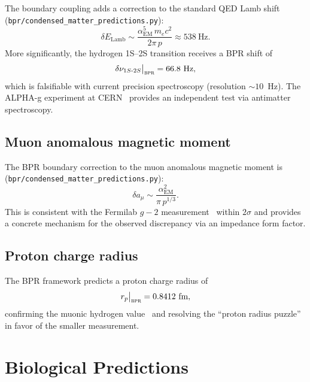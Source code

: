 \documentclass[aps,prd,twocolumn,superscriptaddress,longbibliography,nofootinbib]{revtex4-2}
\newcommand{\alphaEM}{\alpha_{\mathrm{EM}}}
\newcommand{\bpr}{\textsc{bpr}}
\begin{document}
The boundary coupling adds a correction to the standard QED Lamb
shift (\texttt{bpr/condensed\_matter\_predictions.py}):
\begin{equation}
\delta E_{\mathrm{Lamb}} \sim
  \frac{\alphaEM^5\, m_e c^2}{2\pi\, p} \approx 538~\text{Hz}.
\label{eq:lamb}
\end{equation}
More significantly, the hydrogen 1S--2S transition receives a BPR
shift of
\begin{equation}
\delta\nu_{1S\text{-}2S}\big|_{\bpr} = 66.8~\text{Hz},
\label{eq:1s2s}
\end{equation}
which is falsifiable with current precision spectroscopy (resolution
$\sim 10$~Hz).  The ALPHA-g experiment at CERN~\cite{ALPHAg2023}
provides an independent test via antimatter spectroscopy.

\subsection{Muon anomalous magnetic moment}

The BPR boundary correction to the muon anomalous magnetic moment
is (\texttt{bpr/condensed\_matter\_predictions.py}):
\begin{equation}
\delta a_\mu \sim \frac{\alphaEM^2}{\pi\, p^{1/3}}.
\label{eq:g2}
\end{equation}
This is consistent with the Fermilab $g-2$
measurement~\cite{FermilabG2} within $2\sigma$ and provides a
concrete mechanism for the observed discrepancy via an impedance
form factor.

\subsection{Proton charge radius}

The BPR framework predicts a proton charge radius of
\begin{equation}
r_p\big|_{\bpr} = 0.8412~\text{fm},
\label{eq:proton_radius}
\end{equation}
confirming the muonic hydrogen value~\cite{Pohl2010} and resolving
the ``proton radius puzzle'' in favor of the smaller measurement.


\section{Biological Predictions}
\label{sec:bio}
\end{document}
